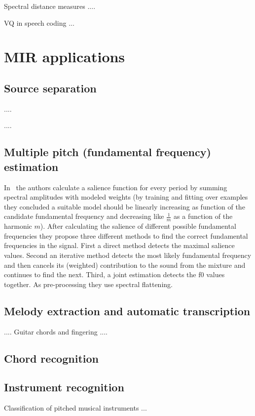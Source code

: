 \documentclass[journal]{IEEEtran}
\begin{document}
Spectral distance measures \cite{viswanathan1976spectralDistance}....

VQ in speech coding \cite{gersho1992vq}...

\section{MIR applications}
\subsection{Source separation}
\cite{slaney1994soundSeparation}....

\cite{ozerov2012general} ....

\subsection{Multiple pitch (fundamental frequency) estimation}
In~\cite{klapuri2006multiple} the authors calculate a salience function for every period by summing spectral amplitudes with modeled weights (by training and fitting over examples they concluded a suitable model should be linearly increasing as function of the candidate fundamental frequency and decreasing like $\frac{1}{m}$ as a function of the harmonic $m$). After calculating the salience of different possible fundamental frequencies they propose three different methods to find the correct fundamental frequencies in the signal. First a direct method detects the maximal salience values. Second an iterative method detects the most likely fundamental frequency and then cancels its (weighted) contribution to the sound from the mixture and continues to find the next. Third, a joint estimation detects the f0 values together.
As pre-processing they use spectral flattening.

\subsection{Melody extraction and automatic transcription}

\cite{benetos2013automatic,ohanlon2013automatic,peeters2006music}....
Guitar chords and fingering \cite{barbancho2012automatic}....
\subsection{Chord recognition}
\subsection{Instrument recognition}
Classification of pitched musical instruments \cite{herrera2006automatic}...
\end{document}
